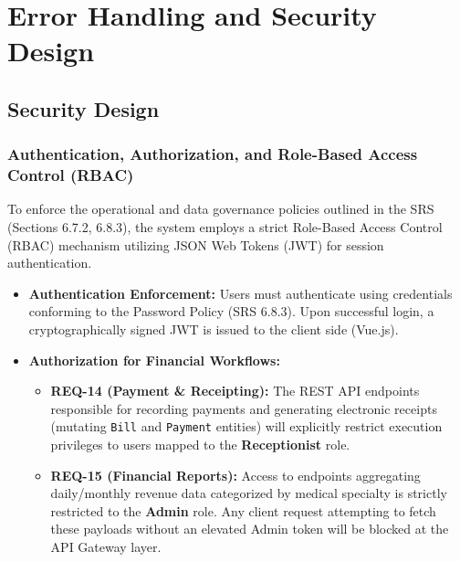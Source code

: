 
\section{Error Handling and Security Design}
\label{sec:error_handling_security}

\subsection{Security Design}
\label{subsec:security_design}

\subsubsection{Authentication, Authorization, and Role-Based Access Control (RBAC)}
To enforce the operational and data governance policies outlined in the SRS (Sections 6.7.2, 6.8.3), the system employs a strict Role-Based Access Control (RBAC) mechanism utilizing JSON Web Tokens (JWT) for session authentication.

\begin{itemize}
	\item \textbf{Authentication Enforcement:} Users must authenticate using credentials conforming to the Password Policy (SRS 6.8.3). Upon successful login, a cryptographically signed JWT is issued to the client side (Vue.js).
	\item \textbf{Authorization for Financial Workflows:} 
	\begin{itemize}
		\item \textbf{REQ-14 (Payment \& Receipting):} The REST API endpoints responsible for recording payments and generating electronic receipts (mutating \texttt{Bill} and \texttt{Payment} entities) will explicitly restrict execution privileges to users mapped to the \textbf{Receptionist} role.
		\item \textbf{REQ-15 (Financial Reports):} Access to endpoints aggregating daily/monthly revenue data categorized by medical specialty is strictly restricted to the \textbf{Admin} role. Any client request attempting to fetch these payloads without an elevated Admin token will be blocked at the API Gateway layer.
	\end{itemize}
\end{itemize}

